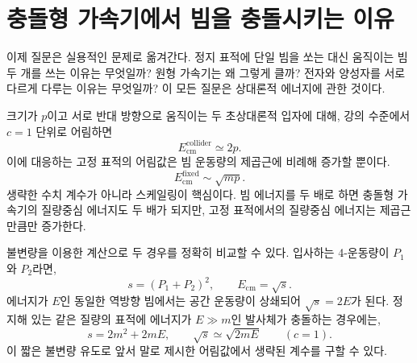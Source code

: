 \section{충돌형 가속기에서 빔을 충돌시키는 이유}

이제 질문은 실용적인 문제로 옮겨간다. 정지 표적에 단일 빔을 쏘는 대신 움직이는 빔 두 개를 쓰는 이유는 무엇일까? 원형 가속기는 왜 그렇게 클까? 전자와 양성자를 서로 다르게 다루는 이유는 무엇일까? 이 모든 질문은 상대론적 에너지에 관한 것이다.

\begin{classroomqa}
\end{classroomqa}

크기가 \(p\)이고 서로 반대 방향으로 움직이는 두 초상대론적 입자에 대해, 강의 수준에서 \(c=1\) 단위로 어림하면
\begin{equation}
E_{\mathrm{cm}}^{\mathrm{collider}}\simeq 2p.
\end{equation}
이에 대응하는 고정 표적의 어림값은 빔 운동량의 제곱근에 비례해 증가할 뿐이다.
\begin{equation}
E_{\mathrm{cm}}^{\mathrm{fixed}}\sim \sqrt{mp}.
\end{equation}
생략한 수치 계수가 아니라 스케일링이 핵심이다. 빔 에너지를 두 배로 하면 충돌형 가속기의 질량중심 에너지도 두 배가 되지만, 고정 표적에서의 질량중심 에너지는 제곱근만큼만 증가한다.

불변량을 이용한 계산으로 두 경우를 정확히 비교할 수 있다. 입사하는 4-운동량이 \(P_1\)와 \(P_2\)라면,
\begin{equation}
s=(P_1+P_2)^2,
\qquad E_{\mathrm{cm}}=\sqrt{s}.
\end{equation}
에너지가 \(E\)인 동일한 역방향 빔에서는 공간 운동량이 상쇄되어 \(\sqrt{s}=2E\)가 된다. 정지해 있는 같은 질량의 표적에 에너지가 \(E\gg m\)인 발사체가 충돌하는 경우에는,
\begin{equation}
s=2m^2+2mE,
\qquad
\sqrt{s}\simeq \sqrt{2mE}
\qquad (c=1).
\end{equation}
이 짧은 불변량 유도로 앞서 말로 제시한 어림값에서 생략된 계수를 구할 수 있다.

